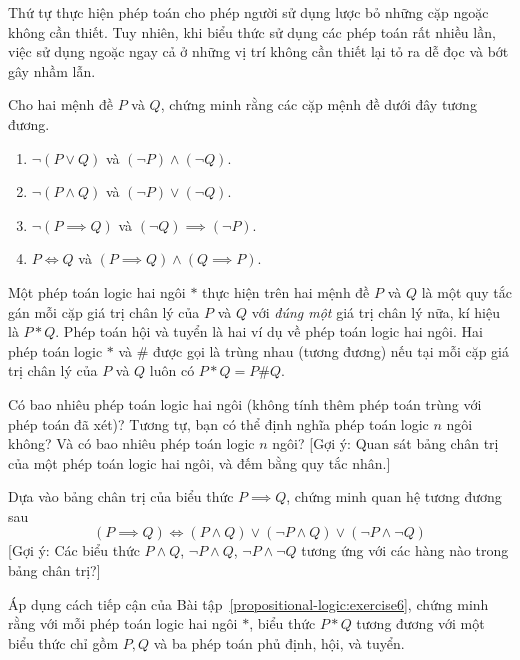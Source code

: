Thứ tự thực hiện phép toán cho phép người sử dụng lược bỏ những cặp ngoặc không cần thiết. Tuy nhiên, khi biểu thức sử dụng các phép toán rất nhiều lần, việc sử dụng ngoặc ngay cả ở những vị trí không cần thiết lại tỏ ra dễ đọc và bớt gây nhầm lẫn.

\begin{exercise}\label{propositional-logic:exercise4}
    Cho hai mệnh đề $P$ và $Q$, chứng minh rằng các cặp mệnh đề dưới đây tương đương.
    \begin{enumerate}[label={(\alph*)},itemsep=0pt]
        \item $\neg (P\vee Q)$ và $(\neg P) \wedge (\neg Q)$.
        \item $\neg (P\wedge Q)$ và $(\neg P)\vee (\neg Q)$.
        \item $\neg (P\implies Q)$ và $(\neg Q)\implies (\neg P)$.
        \item $P\Leftrightarrow Q$ và $(P\implies Q) \wedge (Q\implies P)$.
    \end{enumerate}
\end{exercise}

\begin{exercise}\label{propositional-logic:exercise5}
    Một phép toán logic hai ngôi $*$ thực hiện trên hai mệnh đề $P$ và $Q$ là một quy tắc gán mỗi cặp giá trị chân lý của $P$ và $Q$ với \textit{đúng một} giá trị chân lý nữa, kí hiệu là $P * Q$. Phép toán hội và tuyển là hai ví dụ về phép toán logic hai ngôi. Hai phép toán logic $*$ và $\#$ được gọi là trùng nhau (tương đương) nếu tại mỗi cặp giá trị chân lý của $P$ và $Q$ luôn có $P * Q = P\# Q$.

    Có bao nhiêu phép toán logic hai ngôi (không tính thêm phép toán trùng với phép toán đã xét)? Tương tự, bạn có thể định nghĩa phép toán logic $n$ ngôi không? Và có bao nhiêu phép toán logic $n$ ngôi? [Gợi ý: Quan sát bảng chân trị của một phép toán logic hai ngôi, và đếm bằng quy tắc nhân.]
\end{exercise}

\begin{exercise}\label{propositional-logic:exercise6}
    Dựa vào bảng chân trị của biểu thức $P\implies Q$, chứng minh quan hệ tương đương sau
    \[
        (P\implies Q) \Leftrightarrow (P\wedge Q)\vee (\neg P\wedge Q) \vee (\neg P\wedge \neg Q)
    \]
    [Gợi ý: Các biểu thức $P\wedge Q$, $\neg P\wedge Q$, $\neg P\wedge \neg Q$ tương ứng với các hàng nào trong bảng chân trị?]
\end{exercise}

\begin{exercise}\label{propositional-logic:exercise7}
    Áp dụng cách tiếp cận của Bài tập~\ref{propositional-logic:exercise6}, chứng minh rằng với mỗi phép toán logic hai ngôi $*$, biểu thức $P * Q$ tương đương với một biểu thức chỉ gồm $P, Q$ và ba phép toán phủ định, hội, và tuyển.
\end{exercise}

